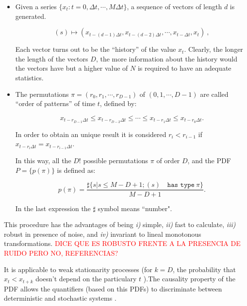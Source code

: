 \begin{itemize}
\item Given a series $\{x_t : t=0, \Delta t, \cdots,M\Delta t \}$, a sequence of vectors of length $d$ is generated.

\begin{equation}
\label{eq:vectores}
(s)\mapsto \left(x_{t-(d-1)\Delta t},x_{t-(d-2)\Delta t},\cdots,x_{t-\Delta t},x_{t}\right) \ ,
\end{equation}

Each vector turns out to be the ``history'' of the value $x_t$. Clearly, the longer the length of the vectors $D$, the more information about the history would the vectors have but a higher value of $N$ is required to have an adequate statistics. 

\item The permutations $\pi=(r_0, r_1, \cdots, r_{D-1})$ of $(0, 1, \cdots, D-1)$ are called ``order of patterns'' of time $t$, defined by:

\begin{equation}
\label{eq:permuta}
x_{t-r_{D-1}\Delta t}\le x_{t-r_{D-2}\Delta t}\le\cdots\le x_{t-r_{1}\Delta t}\le x_{t-r_0\Delta t}.
\end{equation}

In order to obtain an unique result it is considered $r_i<r_{i-1}$ if $x_{t-r_{i}\Delta t}=x_{t-r_{i-1}\Delta t}$.

In this way, all the $D!$ possible permutations $\pi$ of order $D$, and the PDF $P=\{p(\pi)\}$ is defined as:

\begin{equation}
\label{eq:frequ}
p(\pi)=\frac{\sharp \{s|s\leq M-D+1; (s) \quad \texttt{has type}~\pi\}}{M-D+1}.
\end{equation}

In the last expression the $\sharp$ symbol means ``number".
\end{itemize}

This procedure has the advantages of being {\it i)} simple, {\it ii)} fast to calculate, {\it iii)} robust in presence of noise, and {\it iv)} invariant to lineal monotonous transformations. \textcolor{red}{DICE QUE ES ROBUSTO FRENTE A LA PRESENCIA DE RUIDO PERO NO, REFERENCIAS?}

It is applicable to weak stationarity processes (for $k=D$, the probability that $x_t < x_{t+k}$ doesn't depend on the particulary $t$ \cite{Pompe2002}).The causality property of the PDF allows the quantifiers (based on this PDFs) to discriminate between deterministic and stochastic systems \cite{Rosso2007B}.

